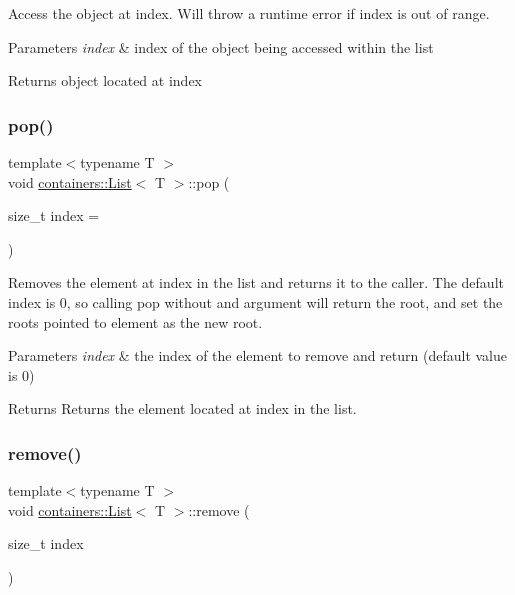 Access the object at {\ttfamily index}. Will throw a runtime error if {\ttfamily index} is out of range.


\begin{DoxyParams}{Parameters}
{\em index} & index of the object being accessed within the list\\
\hline
\end{DoxyParams}
\begin{DoxyReturn}{Returns}
object located at {\ttfamily index} 
\end{DoxyReturn}
\mbox{\label{classcontainers_1_1_list_a533da87ddf7ccd825e80fffa2ff73437}} 
\subsubsection{\texorpdfstring{pop()}{pop()}}
{\footnotesize\ttfamily template$<$typename T $>$ \\
void \hyperlink{classcontainers_1_1_list}{containers\+::\+List}$<$ T $>$\+::pop (\begin{DoxyParamCaption}\item[{size\+\_\+t}]{index = {} }\end{DoxyParamCaption})}

Removes the element at {\ttfamily index} in the list and returns it to the caller. The default {\ttfamily index} is 0, so calling {\ttfamily pop} without and argument will return the root, and set the root\textquotesingle{}s pointed to element as the new root.


\begin{DoxyParams}{Parameters}
{\em index} & the index of the element to remove and return (default value is 0)\\
\hline
\end{DoxyParams}
\begin{DoxyReturn}{Returns}
Returns the element located at {\ttfamily index} in the list. 
\end{DoxyReturn}
\mbox{\label{classcontainers_1_1_list_a39a750f3454f840c0a7c60c6efa03c12}} 
\subsubsection{\texorpdfstring{remove()}{remove()}}
{\footnotesize\ttfamily template$<$typename T $>$ \\
void \hyperlink{classcontainers_1_1_list}{containers\+::\+List}$<$ T $>$\+::remove (\begin{DoxyParamCaption}\item[{size\+\_\+t}]{index }\end{DoxyParamCaption})}

